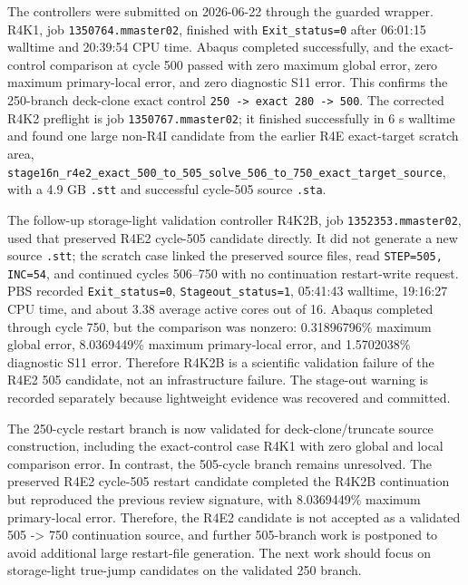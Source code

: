 \documentclass{article}
\begin{document}
The controllers were submitted on 2026-06-22 through the guarded wrapper. R4K1, job \texttt{1350764.mmaster02}, finished with \texttt{Exit\_status=0} after 06:01:15 walltime and 20:39:54 CPU time. Abaqus completed successfully, and the exact-control comparison at cycle 500 passed with zero maximum global error, zero maximum primary-local error, and zero diagnostic S11 error. This confirms the 250-branch deck-clone exact control \texttt{250 -> exact 280 -> 500}. The corrected R4K2 preflight is job \texttt{1350767.mmaster02}; it finished successfully in 6 s walltime and found one large non-R4I candidate from the earlier R4E exact-target scratch area, \texttt{stage16n\_r4e2\_exact\_500\_to\_505\_solve\_506\_to\_750\_exact\_target\_source}, with a 4.9 GB \texttt{.stt} and successful cycle-505 source \texttt{.sta}.

The follow-up storage-light validation controller R4K2B, job \texttt{1352353.mmaster02}, used that preserved R4E2 cycle-505 candidate directly. It did not generate a new source \texttt{.stt}; the scratch case linked the preserved source files, read \texttt{STEP=505, INC=54}, and continued cycles 506--750 with no continuation restart-write request. PBS recorded \texttt{Exit\_status=0}, \texttt{Stageout\_status=1}, 05:41:43 walltime, 19:16:27 CPU time, and about 3.38 average active cores out of 16. Abaqus completed through cycle 750, but the comparison was nonzero: 0.31896796\% maximum global error, 8.0369449\% maximum primary-local error, and 1.5702038\% diagnostic S11 error. Therefore R4K2B is a scientific validation failure of the R4E2 505 candidate, not an infrastructure failure. The stage-out warning is recorded separately because lightweight evidence was recovered and committed.

The 250-cycle restart branch is now validated for deck-clone/truncate source construction, including the exact-control case R4K1 with zero global and local comparison error. In contrast, the 505-cycle branch remains unresolved. The preserved R4E2 cycle-505 restart candidate completed the R4K2B continuation but reproduced the previous review signature, with 8.0369449\% maximum primary-local error. Therefore, the R4E2 candidate is not accepted as a validated 505 -> 750 continuation source, and further 505-branch work is postponed to avoid additional large restart-file generation. The next work should focus on storage-light true-jump candidates on the validated 250 branch.
\end{document}

